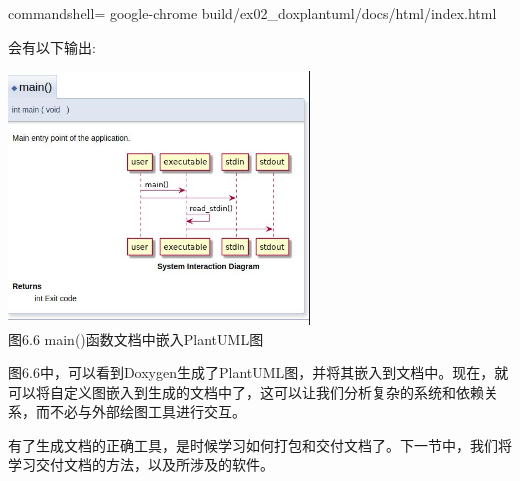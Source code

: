 \begin{tcblisting}{commandshell={}}
google-chrome build/ex02_doxplantuml/docs/html/index.html
\end{tcblisting}

会有以下输出:

\begin{center}
\includegraphics[width=0.6\textwidth]{content/2/chapter6/images/6.jpg}\\
图6.6  main()函数文档中嵌入PlantUML图
\end{center}

图6.6中，可以看到Doxygen生成了PlantUML图，并将其嵌入到文档中。现在，就可以将自定义图嵌入到生成的文档中了，这可以让我们分析复杂的系统和依赖关系，而不必与外部绘图工具进行交互。

有了生成文档的正确工具，是时候学习如何打包和交付文档了。下一节中，我们将学习交付文档的方法，以及所涉及的软件。








